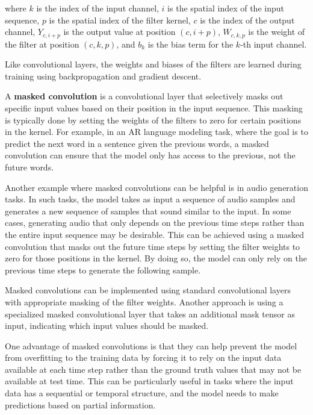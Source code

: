 where $k$ is the index of the input channel, $i$ is the spatial index of the input sequence, $p$ is the spatial index of the filter kernel, $c$ is the index of the output channel, $Y_{c,i+p}$ is the output value at position $(c,i+p)$, $W_{c,k,p}$ is the weight of the filter at position $(c,k,p)$, and $b_k$ is the bias term for the $k$-th input channel.

Like convolutional layers, the weights and biases of the filters are learned during training using backpropagation and gradient descent.

\label{sec:masked-conv}

A \textbf{masked convolution} is a convolutional layer that selectively masks out specific input values based on their position in the input sequence. This masking is typically done by setting the weights of the filters to zero for certain positions in the kernel. For example, in an \ac{AR} language modeling task, where the goal is to predict the next word in a sentence given the previous words, a masked convolution can ensure that the model only has access to the previous, not the future words.

Another example where masked convolutions can be helpful is in audio generation tasks. In such tasks, the model takes as input a sequence of audio samples and generates a new sequence of samples that sound similar to the input. In some cases, generating audio that only depends on the previous time steps rather than the entire input sequence may be desirable. This can be achieved using a masked convolution that masks out the future time steps by setting the filter weights to zero for those positions in the kernel. By doing so, the model can only rely on the previous time steps to generate the following sample.

Masked convolutions can be implemented using standard convolutional layers with appropriate masking of the filter weights. Another approach is using a specialized masked convolutional layer that takes an additional mask tensor as input, indicating which input values should be masked.

One advantage of masked convolutions is that they can help prevent the model from overfitting to the training data by forcing it to rely on the input data available at each time step rather than the ground truth values that may not be available at test time. This can be particularly useful in tasks where the input data has a sequential or temporal structure, and the model needs to make predictions based on partial information.
